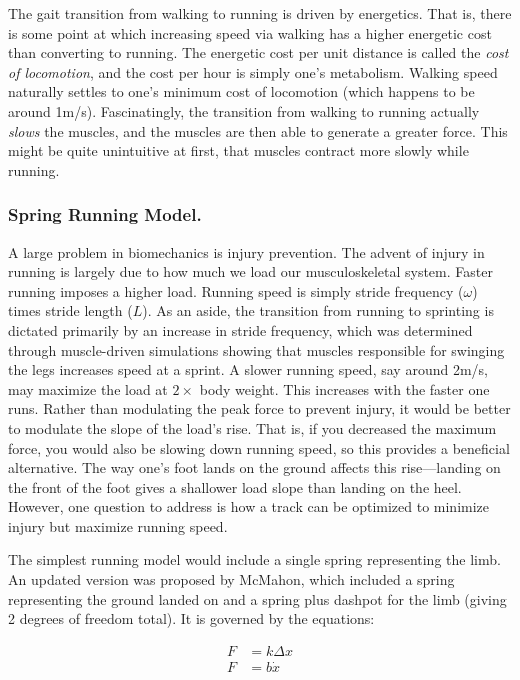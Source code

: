 The gait transition from walking to running is driven by energetics. That is, there is some point at which increasing speed via walking has a higher energetic cost than converting to running. The energetic cost per unit distance is called the \textit{cost of locomotion}, and the cost per hour is simply one's metabolism. Walking speed naturally settles to one's minimum cost of locomotion (which happens to be around 1m/s). Fascinatingly, the transition from walking to running actually \textit{slows} the muscles, and the muscles are then able to generate a greater force. This might be quite unintuitive at first, that muscles contract more slowly while running.\newline

\subsubsection{Spring Running Model.}

A large problem in biomechanics is injury prevention. The advent of injury in running is largely due to how much we load our musculoskeletal system. Faster running imposes a higher load. Running speed is simply stride frequency ($\omega$) times stride length ($L$). As an aside, the transition from running to sprinting is dictated primarily by an increase in stride frequency, which was determined through muscle-driven simulations showing that muscles responsible for swinging the legs increases speed at a sprint. A slower running speed, say around 2m/s, may maximize the load at $2\times$ body weight. This increases with the faster one runs. Rather than modulating the peak force to prevent injury, it would be better to modulate the slope of the load's rise. That is, if you decreased the maximum force, you would also be slowing down running speed, so this provides a beneficial alternative. The way one's foot lands on the ground affects this rise---landing on the front of the foot gives a shallower load slope than landing on the heel. However, one question to address is how a track can be optimized to minimize injury but maximize running speed.\newline

The simplest running model would include a single spring representing the limb. An updated version was proposed by McMahon, which included a spring representing the ground landed on and a spring plus dashpot for the limb (giving 2 degrees of freedom total). It is governed by the equations: 

\begin{equation}
\begin{split}
    F &= k\Delta x \\
    F &= b\dot{x}
\end{split}
\end{equation}

